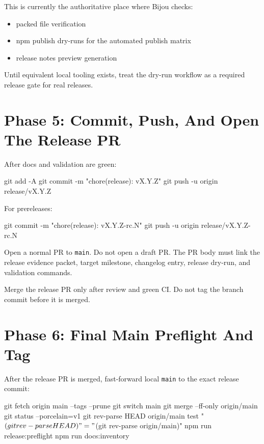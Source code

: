 This is currently the authoritative place where Bijou checks:

\begin{itemize}
\tightlist
\item
  packed file verification
\item
  npm publish dry-runs for the automated publish matrix
\item
  release notes preview generation
\end{itemize}

Until equivalent local tooling exists, treat the dry-run workflow as a required release gate for real releases.

\section{Phase 5: Commit, Push, And Open The Release PR}\label{record-274-phase-5-commit-push-and-open-the-release-pr}

After docs and validation are green:

\begin{CodeBlock}
git add -A
git commit -m "chore(release): vX.Y.Z"
git push -u origin release/vX.Y.Z
\end{CodeBlock}

For prereleases:

\begin{CodeBlock}
git commit -m "chore(release): vX.Y.Z-rc.N"
git push -u origin release/vX.Y.Z-rc.N
\end{CodeBlock}

Open a normal PR to \texttt{m\allowbreak{}a\allowbreak{}i\allowbreak{}n}. Do not open a draft PR. The PR body must link the release evidence packet, target milestone, changelog entry, release dry-run, and validation commands.

Merge the release PR only after review and green CI. Do not tag the branch commit before it is merged.

\section{Phase 6: Final Main Preflight And Tag}\label{record-274-phase-6-final-main-preflight-and-tag}

After the release PR is merged, fast-forward local \texttt{m\allowbreak{}a\allowbreak{}i\allowbreak{}n} to the exact release commit:

\begin{CodeBlock}
git fetch origin main --tags --prune
git switch main
git merge --ff-only origin/main
git status --porcelain=v1
git rev-parse HEAD origin/main
test "$(git rev-parse HEAD)" = "$(git rev-parse origin/main)"
npm run release:preflight
npm run docs:inventory
\end{CodeBlock}

